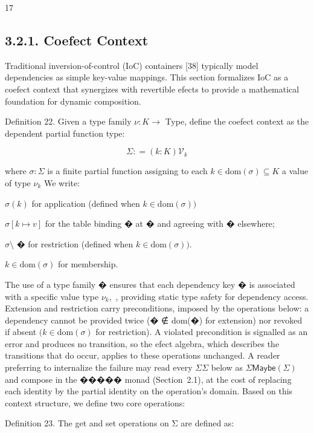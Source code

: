 \documentclass[
  10
]{article}
\begin{document}
17

\subsection{3.2.1. Coefect Context}\label{coefect-context}

Traditional inversion-of-control (IoC) containers {[}38{]} typically
model dependencies as simple key-value mappings. This section formalizes
IoC as a coefect context that synergizes with revertible efects to
provide a mathematical foundation for dynamic composition.

Definition 22. Given a type family \(\nu : K \to\) Type, define the
coefect context as the dependent partial function type:

\[
\Sigma : = ( k : K )  \mathcal { V } _ { k }\tag{20}
\]

where \(\sigma : \Sigma\) is a finite partial function assigning to each
\(k \in \mathrm { d o m } ( \sigma ) \subseteq K\) a value of type
\(\nu _ { k }\) We write:

\(\sigma ( k )\) for application (defined when
\(k \in \mathrm { d o m } ( \sigma ) )\)

\(\sigma [ k \mapsto v ]\) for the table binding � at � and agreeing
with � elsewhere;

\(\sigma \setminus\) � for restriction (defined when
\(k \in \mathrm { d o m } ( \sigma ) ) .\)

\(k \in \mathrm { d o m } ( \sigma )\) for membership.

The use of a type family �︀ ensures that each dependency key � is
associated with a specific value type \(\nu _ { k } ,\) , providing
static type safety for dependency access. Extension and restriction
carry preconditions, imposed by the operations below: a dependency
cannot be provided twice (� ∉ dom(�) for extension) nor revoked if
absent \(( k \in \mathrm { d o m } ( \sigma )\) for restriction). A
violated precondition is signalled as an error and produces no
transition, so the efect algebra, which describes the transitions that
do occur, applies to these operations unchanged. A reader preferring to
internalize the failure may read every \(\Sigma  \Sigma\) below as
\(\Sigma  \mathsf { M a y b e } ( \Sigma )\) and compose in the �����
monad (Section~2.1), at the cost of replacing each identity by the
partial identity on the operation's domain. Based on this context
structure, we define two core operations:

Definition 23. The get and set operations on Σ are defined as:
\end{document}
